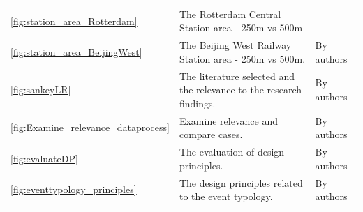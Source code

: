 \documentclass[]{article}
\begin{document}
\begin{xltabular}{\textwidth}{p{0.01\textwidth} p{0.42\textwidth} p{0.50\textwidth}}
\ref{fig:station_area_Rotterdam} & The Rotterdam Central Station area - 250m vs 500m \\

\ref{fig:station_area_BeijingWest} & The Beijing West Railway Station area - 250m vs 500m. & By authors \\

\ref{fig:sankeyLR} & The literature selected and the relevance to the research findings. & By authors \\


\ref{fig:Examine_relevance_dataprocess} & Examine relevance and compare cases. & By authors \\

\ref{fig:evaluateDP} & The evaluation of design principles. & By authors \\

\ref{fig:eventtypology_principles} & The design principles related to the event typology. & By authors \\



    \hline
\end{xltabular}
\end{document}
